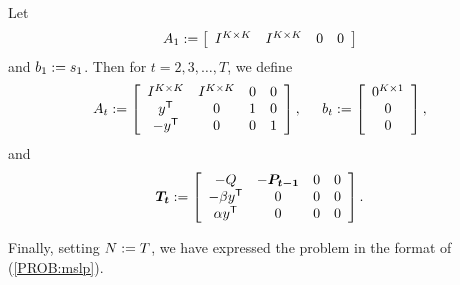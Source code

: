 Let 
\begin{equation*}
A_1 := \left[
	\begin{array}{cccc}
		I^{K \times K} & I^{K \times K} & 0 & 0
	\end{array}
	\right]
\end{equation*}
and $b_1 := s_1$.  Then for $t= 2, 3, \ldots, T$, we define
\begin{equation*}
A_t := \left[
	\begin{array}{cccc}
		I^{K \times K} & I^{K \times K} & 0 & 0\\
		y^{\mbox{\scriptsize\sf T}}	& 0	& 1	& 0\\
		-y^{\mbox{\scriptsize\sf T}}	& 0	& 0	& 1
	\end{array}
		\right],
\hspace{0.2in}
b_t := \left[\begin{array}{c}
	 0^{K \times 1}\\
	0\\
	0\end{array} \right],
\end{equation*}
and
\begin{equation*}
\mathbf{\boldsymbol{T_t}} := \left[
	\begin{array}{cccc}
		-Q	&	-\mathbf{\boldsymbol{P_{t-1}}}	&	0	&	0\\
		-\beta y^{\mbox{\scriptsize\sf T}}	&	0	&	0	&	0\\
		\alpha y^{\mbox{\scriptsize\sf T}}	&	0	&	0	&	0
	\end{array}
		\right].
\end{equation*}

Finally, setting $N:= T$, we have expressed the problem in the format of (\ref{PROB:mslp}).%
